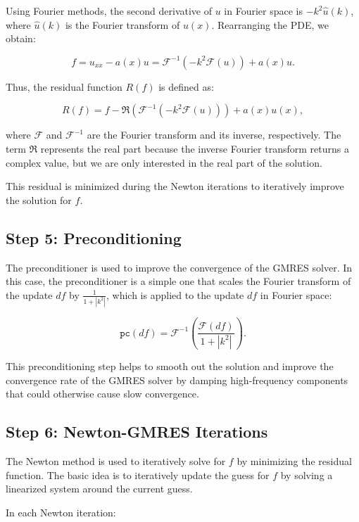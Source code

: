\documentclass{article}
\begin{document}
Using Fourier methods, the second derivative of \( u \) in Fourier space is \( -k^2 \hat{u}(k) \), where \( \hat{u}(k) \) is the Fourier transform of \( u(x) \). Rearranging the PDE, we obtain:

\[
f = u_{xx} - a(x) u = \mathcal{F}^{-1} \left( -k^2 \mathcal{F}(u) \right) + a(x) u.
\]

Thus, the residual function \( R(f) \) is defined as:

\[
R(f) = f - \Re\left(\mathcal{F}^{-1} \left( -k^2 \mathcal{F}(u) \right)\right) + a(x) u(x),
\]

where \( \mathcal{F} \) and \( \mathcal{F}^{-1} \) are the Fourier transform and its inverse, respectively. The term \( \Re \) represents the real part because the inverse Fourier transform returns a complex value, but we are only interested in the real part of the solution.

This residual is minimized during the Newton iterations to iteratively improve the solution for \( f \).

\subsection*{Step 5: Preconditioning}

The preconditioner is used to improve the convergence of the GMRES solver. In this case, the preconditioner is a simple one that scales the Fourier transform of the update \( df \) by \( \frac{1}{1 + |k^2|} \), which is applied to the update \( df \) in Fourier space:

\[
\texttt{pc}(df) = \mathcal{F}^{-1} \left( \frac{\mathcal{F}(df)}{1 + |k^2|} \right).
\]

This preconditioning step helps to smooth out the solution and improve the convergence rate of the GMRES solver by damping high-frequency components that could otherwise cause slow convergence.

\subsection*{Step 6: Newton-GMRES Iterations}

The Newton method is used to iteratively solve for \( f \) by minimizing the residual function. The basic idea is to iteratively update the guess for \( f \) by solving a linearized system around the current guess.

In each Newton iteration:
\end{document}
